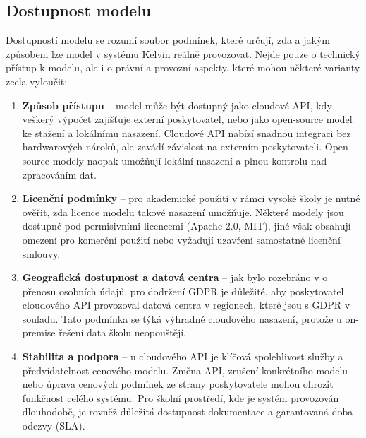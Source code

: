 \subsection{Dostupnost modelu}
\label{subsec:criteria-availability}

Dostupností modelu se rozumí soubor podmínek, které určují, zda a jakým způsobem lze model v systému Kelvin reálně provozovat.
Nejde pouze o technický přístup k modelu, ale i o právní a provozní aspekty, které mohou některé varianty zcela vyloučit:

\begin{enumerate}
    \item \textbf{Způsob přístupu} -- model může být dostupný jako cloudové API, kdy veškerý výpočet zajišťuje externí poskytovatel, nebo jako open-source model ke stažení a lokálnímu nasazení.
    Cloudové API nabízí snadnou integraci bez hardwarových nároků, ale zavádí závislost na externím poskytovateli.
    Open-source modely naopak umožňují lokální nasazení a plnou kontrolu nad zpracováním dat.

    \item \textbf{Licenční podmínky} -- pro akademické použití v rámci vysoké školy je nutné ověřit, zda licence modelu takové nasazení umožňuje.
    Některé modely jsou dostupné pod permisivními licencemi (Apache 2.0, MIT), jiné však obsahují omezení pro komerční použití nebo vyžadují uzavření samostatné licenční smlouvy.

    \item \textbf{Geografická dostupnost a datová centra} -- jak bylo rozebráno v  o přenosu osobních údajů, pro dodržení GDPR je důležité, aby poskytovatel cloudového API provozoval datová centra v regionech, které jsou s GDPR v souladu.
    Tato podmínka se týká výhradně cloudového nasazení, protože u on-premise řešení data školu neopouštějí.

    \item \textbf{Stabilita a podpora} -- u cloudového API je klíčová spolehlivost služby a předvídatelnost cenového modelu.
    Změna API, zrušení konkrétního modelu nebo úprava cenových podmínek ze strany poskytovatele mohou ohrozit funkčnost celého systému.
    Pro školní prostředí, kde je systém provozován dlouhodobě, je rovněž důležitá dostupnost dokumentace a garantovaná doba odezvy (SLA).
\end{enumerate}

\endinput